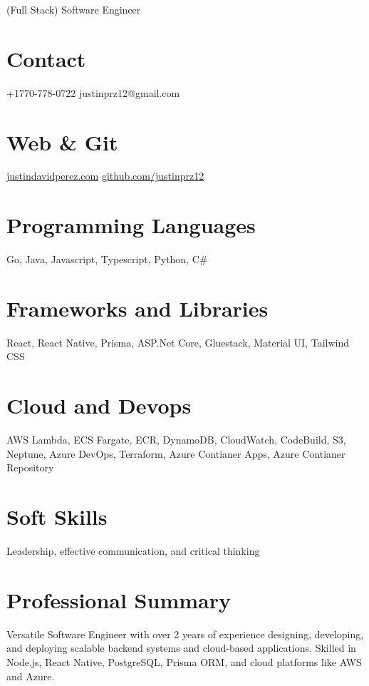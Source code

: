 \documentclass[]{friggeri-cv}
\begin{document}
      {(Full Stack) Software Engineer}
      

\begin{aside}
  \section{Contact}
    +1770-778-0722
    justinprz12@gmail.com
    ~
  \section{Web \& Git}
    \href{http://www.justindavidperez.com}{justindavidperez.com}
    \href{https://github.com/JustinPerez12}{github.com/justinprz12}
  \section{Programming Languages}
    Go, Java, Javascript, Typescript, Python, C\#
  \section{Frameworks and Libraries}
    React, React Native, Prisma, ASP.Net Core, Gluestack, Material UI, Tailwind CSS
  \section{Cloud and Devops}
    AWS Lambda, ECS Fargate, ECR, DynamoDB, CloudWatch, CodeBuild, S3, Neptune, Azure DevOps, Terraform, Azure Contianer Apps, Azure Contianer Repository
  \section{Soft Skills}
    Leadership, effective communication, and critical thinking
\end{aside}

\section{Professional Summary}
Versatile Software Engineer with over 2 years of experience designing, developing, and deploying scalable backend systems and cloud-based applications. Skilled in Node.js, React Native, PostgreSQL, Prisma ORM, and cloud platforms like AWS and Azure.
\end{document}
